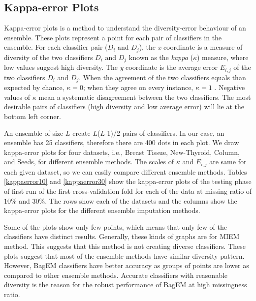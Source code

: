 \documentclass{iosart2c}
\begin{document}
\subsection{Kappa-error Plots}
Kappa-error plots \cite{Kappa} is a method to understand the diversity-error behaviour of an ensemble. 
These plots represent a point for each pair of classifiers in the ensemble. For each classifier pair ($D_i$ and $D_j$), the {\it x} coordinate is a measure of diversity of the two classifiers $D_i$ and $D_j$ known as the {\it kappa} ($\kappa $) measure, where low values suggest high diversity. The {\it y} coordinate is the average error $E_{i,j}$ of the two classifiers $D_i$ and $D_j$. When the agreement of the two classifiers equals than expected by chance, $\kappa = 0$; when they agree on every instance, $\kappa = 1$ \cite{Dietterich2000}. Negative values of $\kappa$ mean a systematic disagreement between the two classifiers. The   most   desirable  pairs  of classifiers (high diversity and low average error) will lie at the bottom left corner.

An ensemble of size $L$ create $L$($L$-1)/2 pairs of  classifiers. In our case, an ensemble has 25 classifiers, therefore there are 400 dots in each plot.
We draw kappa-error plots for four datasets, i.e., Breast Tissue, New-Thyroid, Column, and Seeds, for different ensemble methods.
The scales of $\kappa$ and $E_{i,j}$ are same for each given dataset, so we can easily compare different ensemble methods. Tables \ref{kappaerror10} and \ref{kappaerror30} show the kappa-error plots of the testing phase of first run of the first cross-validation fold for each of the data at missing ratio of $10\%$ and $30\%$. The rows show each of the datasets and the columns show the kappa-error plots for the different ensemble imputation methods. 

Some of the plots show only few points, which means that only few of the classifiers have distinct results. Generally, these kinds of graphs are for MIEM method. This suggests that this method is not creating diverse classifiers. 
These plots suggest that most of the ensemble methods have similar diversity pattern. However, BagEM classifiers have better accuracy as groups of points are lower as compared to other ensemble methods. Accurate classifiers with reasonable  diversity is  the reason for the robust performance of BagEM at high missingness ratio.
\end{document}
